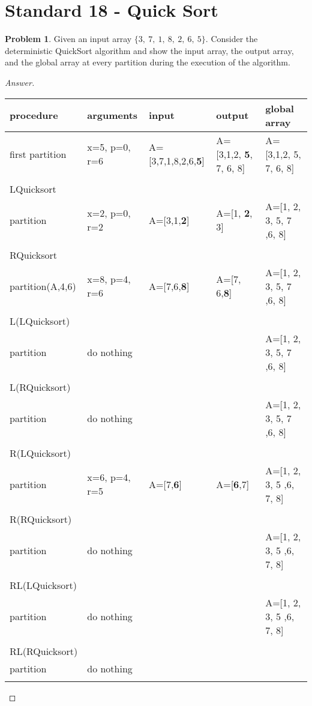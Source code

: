 \documentclass[11pt]{article}
\theoremstyle{definition}
\theoremstyle{definition}
\newtheorem{required}{Problem}
\theoremstyle{definition}
\begin{document}
\newpage
\section{Standard 18 - Quick Sort }
\begin{required}
Given an input array $\{3,~7,~1,~8,~2,~6,~5\}$. Consider the deterministic QuickSort algorithm and show the input array, the output array, and the global array at every partition during the execution of the algorithm.

\begin{proof}[Answer]

\begin{tabular}{lll | ll}

procedure  &  arguments  &  input  &  output  &  global array  \\
\hline
first partition &  x=5, p=0, r=6  &  A=[3,7,1,8,2,6,\textbf{5}]  & A=[3,1,2, \textbf{5}, 7, 6, 8] &  A=[3,1,2, 5, 7, 6, 8] \\
\\
LQuicksort \\ partition & x=2, p=0, r=2 &  A=[3,1,\textbf{2}]  & A=[1, \textbf{2}, 3]  &  A=[1, 2, 3, 5, 7 ,6, 8] \\
\\
RQuicksort \\partition(A,4,6) &  x=8, p=4, r=6  &  A=[7,6,\textbf{8}]  &  A=[7, 6,\textbf{8}]  &  A=[1, 2, 3, 5, 7 ,6, 8] \\
\\
L(LQuicksort) \\ partition & do nothing &    &  &   A=[1, 2, 3, 5, 7 ,6, 8] \\
\\
L(RQuicksort) \\ partition & do nothing &    &  &   A=[1, 2, 3, 5, 7 ,6, 8] \\
\\
R(LQuicksort) \\ partition &  x=6, p=4, r=5  &  A=[7,\textbf{6}]  &  A=[\textbf{6},7]  &  A=[1, 2, 3, 5 ,6, 7, 8]  \\
\\
R(RQuicksort) \\ partition & do nothing &  &    &  A=[1, 2, 3, 5 ,6, 7, 8]  \\
\\
RL(LQuicksort) \\ partition & do nothing &  &    &  A=[1, 2, 3, 5 ,6, 7, 8]  \\
\\
RL(RQuicksort) \\ partition &  do nothing  &  &   &   \\
\\


\end{tabular}

\end{proof}

\end{required}



\end{document}
